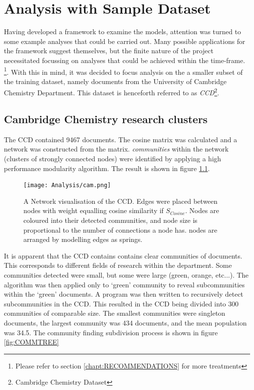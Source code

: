 \chapter{Analysis with Sample Dataset}
Having developed a framework to examine the models, attention was turned to some example analyses that could be carried out. Many possible applications for the framework suggest themselves, but the finite nature of the project necessitated focussing on analyses that could be achieved within the time-frame. \footnote{Please refer to section \ref{chapt:RECOMMENDATIONS} for more treatments}. With this in mind, it was decided to focus analysis on the a smaller subset of the training dataset, namely documents from the University of Cambridge Chemistry Department. This dataset is henceforth referred to as \emph{CCD}\footnote{Cambridge Chemistry Dataset}.
\section{Cambridge Chemistry research clusters}
The CCD contained 9467 documents. The cosine matrix was calculated and a network was constructed from the matrix. \emph{communities} within the network (clusters of strongly connected nodes) were identified by applying a high performance modularity algorithm\cite{modularity1}\cite{modularity2}. The result is shown in figure \ref{fig:CAMCOMMUNITIES}.
\begin{center}
\begin{figure}[H]
\label{fig:CAMCOMMUNITIES}
  \centering
    \texttt{[image: Analysis/cam.png]}
    \caption{A Network visualisation of the CCD. Edges were placed between nodes with weight equalling cosine similarity if $S_{Cosine}$. Nodes are coloured into their detected communities, and node size is proportional to the number of connections a node has. nodes are arranged by modelling edges as springs.}
\end{figure} 
\end{center}
It is apparent that the CCD contains contains clear communities of documents. This corresponds to different fields of research within the department. Some communities detected were small, but some were large (green, orange, etc...). The algorithm was then applied only to `green' community to reveal subcommunities within the `green' documents. A program was then written to recursively detect subcommunities in the CCD. This resulted in the CCD being divided into 300 communities of comparable size. The smallest communities were singleton documents, the largest community was 434 documents, and the mean population was 34.5. The community finding subdivision process is shown in figure \ref{fig:COMMTREE}
